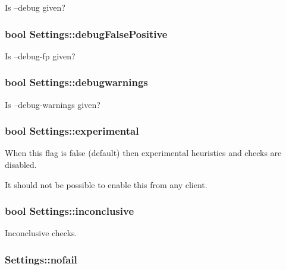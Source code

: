 Is --debug given? 

\hypertarget{class_settings_acca1011cb5bc234467cd3173da3e5f7e}{
\subsubsection[{debug\-False\-Positive}]{\setlength{\rightskip}{0pt plus 5cm}bool Settings\-::debug\-False\-Positive}}\label{class_settings_acca1011cb5bc234467cd3173da3e5f7e}


Is --debug-\/fp given? 

\hypertarget{class_settings_aff86aa98beb34d00d4b46b5fa0768cdc}{
\subsubsection[{debugwarnings}]{\setlength{\rightskip}{0pt plus 5cm}bool Settings\-::debugwarnings}}\label{class_settings_aff86aa98beb34d00d4b46b5fa0768cdc}


Is --debug-\/warnings given? 

\hypertarget{class_settings_a66bd09ed65174792fef48d5948abfc40}{
\subsubsection[{experimental}]{\setlength{\rightskip}{0pt plus 5cm}bool Settings\-::experimental}}\label{class_settings_a66bd09ed65174792fef48d5948abfc40}
When this flag is false (default) then experimental heuristics and checks are disabled.

It should not be possible to enable this from any client. \hypertarget{class_settings_a56c6e511f3a996d891bd2b9417d6670e}{
\subsubsection[{inconclusive}]{\setlength{\rightskip}{0pt plus 5cm}bool Settings\-::inconclusive}}\label{class_settings_a56c6e511f3a996d891bd2b9417d6670e}


Inconclusive checks. 

\hypertarget{class_settings_a9bdd97a6626124e38b19503b9fd7a6f0}{
\subsubsection[{nofail}]{ Settings\-::nofail}}\label{class_settings_a9bdd97a6626124e38b19503b9fd7a6f0}


